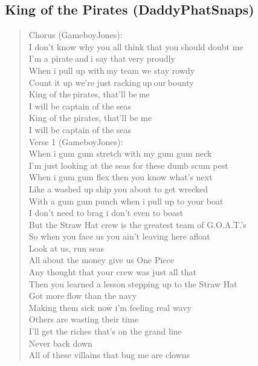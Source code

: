 \documentclass[11pt]{article}
\begin{document}
\subsection{King of the Pirates (DaddyPhatSnaps)}
\label{sec:orgd8b7ecc}
\begin{verse}
Chorus (GameboyJones):\\
I don't know why you all think that you should doubt me\\
I’m a pirate and i say that very proudly\\
When i pull up with my team we stay rowdy\\
Count it up we're just racking up our bounty\\
King of the pirates, that'll be me\\
I will be captain of the seas\\
King of the pirates, that’ll be me\\
I will be captain of the seas\\
\vspace*{1em}
Verse 1 (GameboyJones):\\
When i gum gum stretch with my gum gum neck\\
I'm just looking at the seas for these dumb scum pest\\
When i gum gum flex then you know what's next\\
Like a washed up ship you about to get wrecked\\
With a gum gum punch when i pull up to your boat\\
I don't need to brag i don't even to boast\\
But the Straw Hat crew is the greatest team of G.O.A.T.'s\\
So when you face us you ain't leaving here afloat\\
Look at us, run seas\\
All about the money give us One Piece\\
Any thought that your crew was just all that\\
Then you learned a lesson stepping up to the Straw Hat\\
Got more flow than the navy\\
Making them sick now i'm feeling real wavy\\
Others are wasting their time\\
I’ll get the riches that’s on the grand line\\
Never back down\\
All of these villains that bug me are clowns\\

\end{verse}
\end{document}
